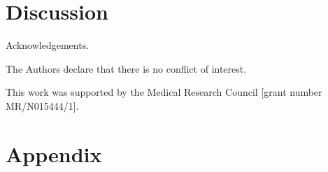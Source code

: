 \documentclass[sagev, Crown]{sagej} %
\begin{document}
\section{Discussion}


\begin{acks}
Acknowledgements.
\end{acks}

\begin{dci}
The Authors declare that there is no conflict of interest.
\end{dci}

\begin{funding}
This work was supported by the Medical Research Council [grant number MR/N015444/1].
\end{funding}




\section*{Appendix}
\end{document}
